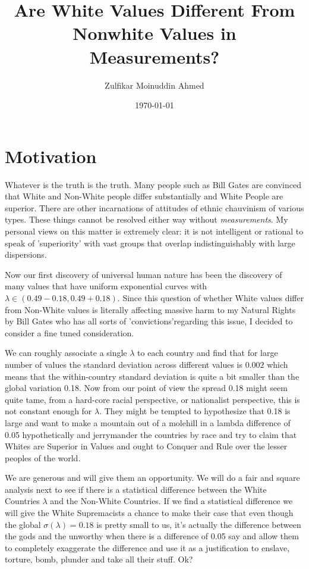 \documentclass{amsart}
\title{Are White Values Different From Nonwhite Values in Measurements?}
\author{Zulfikar Moinuddin Ahmed}
\date{\today}
\begin{document}
\maketitle

\section{Motivation}

Whatever is the truth is the truth.  Many people such as Bill Gates are convinced that White and Non-White people differ substantially and White People are superior.  There are other incarnations of attitudes of ethnic chauvinism of various types.  These things cannot be resolved either way without {\em measurements}.  My personal views on this matter is extremely clear: it is not intelligent or rational to speak of 'superiority' with vast groups that overlap indistinguishably with large dispersions.

Now our first discovery of universal human nature has been the discovery of many values that have uniform exponential curves with $\lambda \in (0.49 - 0.18, 0.49 + 0.18)$.  Since this question of whether White values differ from Non-White values is literally affecting massive harm to my Natural Rights by Bill Gates who has all sorts of 'convictions'regarding this issue, I decided to consider a fine tuned consideration.  

We can roughly associate a single $\lambda$ to each country and find that for large number of values the standard deviation across different values is $0.002$ which means that the within-country standard deviation is quite a bit smaller than the global variation 0.18.  Now from our point of view the spread 0.18 might seem quite tame, from a hard-core racial perspective, or nationalist perspective, this is not constant enough for $\lambda$.  They might be tempted to hypothesize that 0.18 is large and want to make a mountain out of a molehill in a lambda difference of 0.05 hypothetically and jerrymander the countries by race and try to claim that Whites are Superior in Values and ought to Conquer and Rule over the lesser peoples of the world.

We are generous and will give them an opportunity.  We will do a fair and square analysis next to see if there is a statistical difference between the White Countries $\lambda$ and the Non-White Countries.  If we find a statistical difference we will give the White Supremacists a chance to make their case that even though the global $\sigma(\lambda)= 0.18$ is pretty small to us, it's actually the difference between the gods and the unworthy when there is a difference of 0.05 say and allow them to completely exaggerate the difference and use it as a justification to enslave, torture, bomb, plunder and take all their stuff.  Ok?
\end{document}
